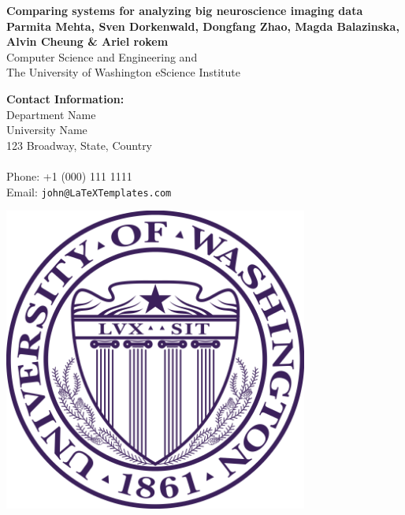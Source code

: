 \documentclass[a0,landscape]{a0poster}
\begin{document}


\begin{minipage}[b]{0.55\linewidth}
\veryHuge \color{NavyBlue} \textbf{Comparing systems for analyzing big neuroscience imaging data} \color{Black}\\ %
\huge \textbf{Parmita Mehta, Sven Dorkenwald, Dongfang Zhao, Magda Balazinska, Alvin Cheung \& Ariel rokem}\\ %
\huge Computer Science and Engineering and\\ %
\huge The University of Washington eScience Institute\\ %

\end{minipage}
%
\begin{minipage}[b]{0.25\linewidth}
\color{DarkSlateGray}\Large \textbf{Contact Information:}\\
Department Name\\ %
University Name\\
123 Broadway, State, Country\\\\
Phone: +1 (000) 111 1111\\ %
Email: \texttt{john@LaTeXTemplates.com}\\ %
\end{minipage}
%
\begin{minipage}[b]{0.19\linewidth}
\includegraphics[width=10cm]{logo.png} %
\end{minipage}
\end{document}
